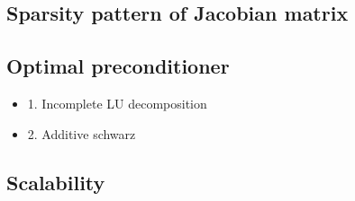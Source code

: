 \subsection{Sparsity pattern of Jacobian matrix}

\subsection{Optimal preconditioner}

\begin{itemize}
					 \item 1. Incomplete LU decomposition
					 \item 2. Additive schwarz
\end{itemize}

\subsection{Scalability}

%

